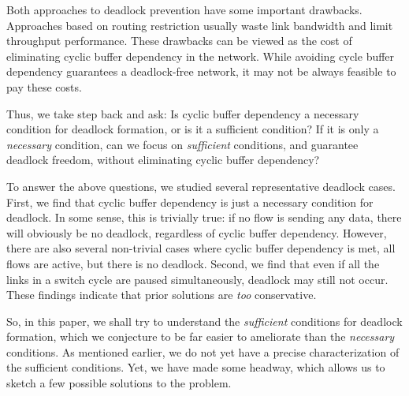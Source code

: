 Both approaches to deadlock prevention have some important drawbacks.
Approaches based on routing restriction usually waste link bandwidth and limit
throughput performance.  These drawbacks can be viewed as the cost of eliminating cyclic buffer dependency in the network. While avoiding cycle buffer dependency guarantees a deadlock-free network, it may not be always feasible to pay these costs.

Thus, we take step back and ask: Is cyclic buffer dependency a
necessary condition for deadlock formation, or is it a sufficient condition? If
it is only a {\em necessary} condition, can we focus on {\em sufficient}
conditions, and guarantee deadlock freedom, without  eliminating cyclic buffer
dependency?

To answer the above questions, we studied several representative deadlock cases.
First, we find that cyclic buffer dependency is
just a necessary condition for deadlock. In some sense, this is trivially true:
if no flow is sending any data, there will obviously be no deadlock, regardless
of cyclic buffer dependency.  However, there are also several non-trivial cases
where cyclic buffer dependency is met, all flows are active, but there is no
deadlock.  Second, we find that even if all the links in a switch cycle are
paused simultaneously, deadlock may still not occur.  These findings
indicate that prior solutions are {\em too} conservative.

So, in this paper, we shall try to understand the {\em sufficient} conditions
for deadlock formation, which we conjecture to be far easier to ameliorate than
the {\em necessary} conditions. As mentioned earlier, we do not yet have a
precise characterization of the sufficient conditions. Yet, we have made some
headway, which allows us to sketch a few possible solutions to the problem.

